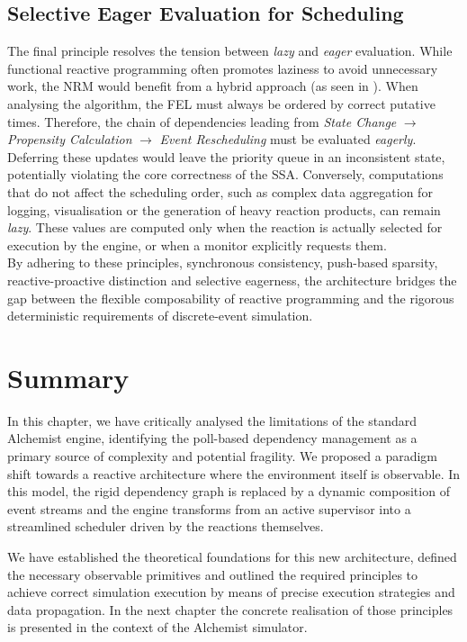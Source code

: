 \subsection{Selective Eager Evaluation for Scheduling}\label{ssec:eager_lazy}
The final principle resolves the tension between \emph{lazy} and \emph{eager}
evaluation. While functional reactive programming often promotes laziness to
avoid unnecessary work, the \ac{NRM} would benefit from a hybrid approach (as
seen in \cite{elliott2009PPFRP}). When analysing the algorithm, the \ac{FEL}
must always be ordered by correct putative times. Therefore, the chain of
dependencies leading from \emph{State Change} $\to$ \emph{Propensity
	Calculation} $\to$ \emph{Event Rescheduling} must be evaluated \emph{eagerly}.
Deferring these updates would leave the priority queue in an inconsistent
state, potentially violating the core correctness of the \ac{SSA}. Conversely,
computations that do not affect the scheduling order, such as complex data
aggregation for logging, visualisation or the generation of heavy reaction
products, can remain \emph{lazy}. These values are computed only when the
reaction is actually selected for execution by the engine, or when a monitor
explicitly requests them.
\newline
\\

By adhering to these principles, synchronous consistency, push-based sparsity,
reactive-proactive distinction and selective eagerness, the architecture
bridges the gap between the flexible composability of reactive programming and
the rigorous deterministic requirements of discrete-event simulation.

\section{Summary}
In this chapter, we have critically analysed the limitations of the standard
Alchemist engine, identifying the poll-based dependency management as a primary
source of complexity and potential fragility. We proposed a paradigm shift
towards a reactive architecture where the environment itself is observable. In
this model, the rigid dependency graph is replaced by a dynamic composition of
event streams and the engine transforms from an active supervisor into a
streamlined scheduler driven by the reactions themselves.

We have established the theoretical foundations for this new architecture,
defined the necessary observable primitives and outlined the required
principles to achieve correct simulation execution by means of precise
execution strategies and data propagation. In the next chapter the concrete
realisation of those principles is presented in the context of the Alchemist
simulator.


